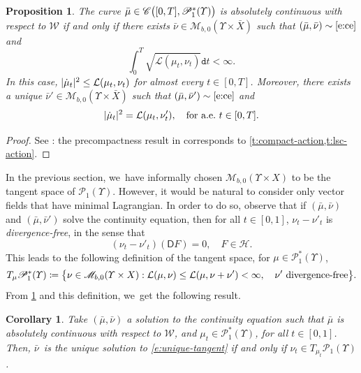 \documentclass[JEP,XML,SOM,Unicode,published]{cedram}
\newtheorem{proposition}[theorem]{Proposition}
\newtheorem{corollary}[theorem]{Corollary}
\theoremstyle{definition}
\theoremstyle{remark}
\DeclarePairedDelimiter{\paren}{\lparen}{\rparen}
\DeclarePairedDelimiter{\set}{\lbrace}{\rbrace}
\DeclarePairedDelimiter{\abs}{\lvert}{\rvert}
\begin{document}
\begin{proposition}\label{t:wcurl-absolutely-continuous}
The curve $\bar{\mu} \in \mathscr{C}\paren[\big]{[0,T], \mathscr{P}^{*}_{1}(\varUpsilon)}$ is absolutely continuous with respect to $\mathcal{W}$ if and only if there exists $\bar{\nu} \in \mathscr{M}_{b,0}(\varUpsilon \times \bar{X})$ such that $(\bar{\mu}, \bar{\nu}) \sim \cref{e:ce}$ and
\begin{equation*}
\int_{0}^{T} \sqrt{\mathcal{L}(\mu_{t}, \nu_{t})} \mathtt{d} t < \infty.
\end{equation*}
In this case, $\abs{\dot{\mu}_{t}}^{2} \leq \mathcal{L}(\mu_{t}, \nu_{t})$ for almost every $t \in [0,T]$.
Moreover, there exists a unique $\bar{\nu}' \in \mathscr{M}_{b,0}(\varUpsilon \times \bar{X})$ such that $(\bar{\mu}, \bar{\nu}') \sim \cref{e:ce}$ and
\begin{equation}\label{e:unique-tangent}
\abs{\dot{\mu}_{t}}^{2} = \mathcal{L}(\mu_{t}, \nu'_{t}), \quad \text{for a.e.}\ t \in [0,T].
\end{equation}
\end{proposition}
\begin{proof}
See \cite[Th.\,5.17]{DNS09}: the precompactness result in \cite[Cor.\,4.10]{DNS09} corresponds to \cref{t:compact-action,t:lsc-action}.
\end{proof}

In the previous section, we~have informally chosen $\mathscr{M}_{b,0}(\varUpsilon \times X)$ to be the tangent space of $\mathscr{P}_{1}(\varUpsilon)$.
However, it would be natural to consider only vector fields that have minimal Lagrangian.
In order to do so, observe that if $(\bar{\mu}, \bar{\nu})$ and $(\bar{\mu}, \bar{\nu}')$ solve the continuity equation, then for all $t \in [0,1]$, $\nu_{t} - \nu'_{t}$ is \emph{divergence-free}, in the sense that
\begin{equation*}
(\nu_{t} - \nu'_{t})(\mathsf{D} F) = 0, \quad F \in \mathscr{H}.
\end{equation*}
This leads to the following definition of the tangent space, for $\mu \in \mathscr{P}_{1}^{*}(\varUpsilon)$,
\begin{equation*}
T_{\mu} \mathscr{P}^{*}_{1}(\varUpsilon) \coloneq \set[\big]{ \nu \in \mathscr{M}_{b,0}(\varUpsilon \times X) : \mathcal{L}(\mu, \nu) \leq \mathcal{L}(\mu, \nu + \nu') < \infty,\quad \nu' \ \text{divergence-free} }.
\end{equation*}
From \cref{t:wcurl-absolutely-continuous} and this definition, we~get the following result.
\begin{corollary}\label{t:nu-tangent}
Take $(\bar{\mu}, \bar{\nu})$ a solution to the continuity equation such that $\bar{\mu}$ is absolutely continuous with respect to $\mathcal{W}$, and $\mu_{t} \in \mathscr{P}_{1}^{*}(\varUpsilon)$, for all $t \in [0,1]$.
Then, $\bar{\nu}$~is the unique solution to \cref{e:unique-tangent} if and only if $\nu_{t} \in T_{\mu_{t}} \mathscr{P}_{1}(\varUpsilon)$.
\end{corollary}
\end{document}
